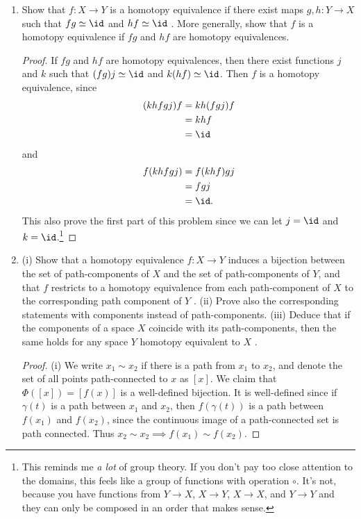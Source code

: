 \documentclass[12pt,letterpaper]{article}
\begin{document}
\begin{enumerate}
\begin{proof}
For the converse direction, let $Y=X$. Then $\id_X$ satifies the hypothesis for both (i) and (i), so is nullhomotopic and we're done.
\end{proof}

\item Show that $f : X \to Y$ is a homotopy equivalence if there exist maps $g, h : Y\to X$ such that $f g \simeq \id$  and $hf \simeq \id$ . More generally, show that $f$ is a homotopy equivalence if $f g$ and $hf$ are homotopy equivalences.

\begin{proof}
If $fg$ and $hf$ are homotopy equivalences, then there exist functions $j$ and $k$ such that $(fg)j\simeq\id$ and $k(hf)\simeq\id$. Then $f$ is a homotopy equivalence, since 
\begin{align*}
(khfgj)f&= kh(fgj)f \\
&= khf \\
&= \id \\
\end{align*}
and 
\begin{align*}
f(khfgj)&= f(khf)gj \\
&= fgj \\
&= \id. \\
\end{align*}
This also prove the first part of this problem since we can  let $j=\id$ and $ k=\id$.\footnote{This reminds me \emph{a lot} of group theory. If you don't pay too close attention to the domains, this feels like a group of functions with operation $\circ$. It's not, because you have functions from $Y\to X$, $X\to Y$, $X\to X$, and $Y\to Y$ and they can only be composed in an order that makes sense.}
\end{proof}

\pagebreak
\item (i) Show that a homotopy equivalence $f : X\to Y$ induces a bijection between the set
of path-components of $X$ and the set of path-components of $Y$, and that $f$ restricts to
a homotopy equivalence from each path-component of $X$ to the corresponding path component of $Y$ . (ii) Prove also the corresponding statements with components instead
of path-components. (iii) Deduce that if the components of a space $X$ coincide with its
path-components, then the same holds for any space $Y$ homotopy equivalent to $X$ .

\begin{proof}(i) 
We write $x_1\sim x_2$ if there is a path from $x_1$ to $x_2$, and denote the set of all points path-connected to $x$ as $[x]$. We claim that $\Phi([x])=[f(x)]$ is a well-defined bijection. It is well-defined since if $\gamma(t)$ is a path between $x_1$ and $x_2$, then $f(\gamma(t)) $ is a path between $f(x_1)$ and $f(x_2)$, since the continuous image of a path-connected set is path connected. Thus $x_2\sim x_2\implies f(x_1)\sim f(x_2)$. 


\end{proof}
\end{enumerate}
\end{document}
